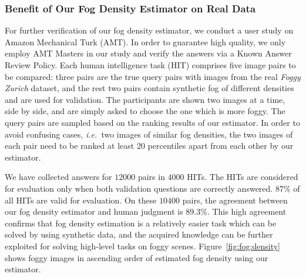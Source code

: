 \documentclass[twocolumn]{svjour3}          \smartqed  \usepackage{graphicx}
\newcommand{\ie}{\mbox{\emph{i.e.\ }}}
\begin{document}

\subsubsection{Benefit of Our Fog Density Estimator on Real Data}
\label{sec:exp:fog:density}


For further verification of our fog density estimator, we conduct a user study on Amazon Mechanical Turk (AMT). In order to guarantee high quality, we only employ AMT Masters in our study and verify the answers via a Known Answer Review Policy. Each human intelligence task (HIT) comprises five image pairs to be compared: three pairs are the true query pairs with images from the real \emph{Foggy Zurich} dataset, and the rest two pairs contain synthetic fog of different densities and are used for validation. The participants are shown two images at a time, side by side, and are simply asked to choose the one which is more foggy. The query pairs are sampled based on the ranking results of our estimator. In order to avoid confusing cases, \ie{}two images of similar fog densities, the two images of each pair need to be ranked at least $20$ percentiles apart from each other by our estimator.

We have collected answers for $12000$ pairs in $4000$ HITs. The HITs are considered for evaluation only when both validation questions are correctly answered. $87\%$ of all HITs are valid for evaluation. On these $10400$ pairs, the agreement between our fog density estimator and human judgment is $89.3\%$. This high agreement confirms that fog density estimation is a relatively easier task which can be solved by using synthetic data, and the acquired knowledge can be further exploited for solving high-level tasks on foggy scenes. Figure~\ref{fig:fog:density} shows foggy images in ascending order of estimated fog density using our estimator.
\end{document}
